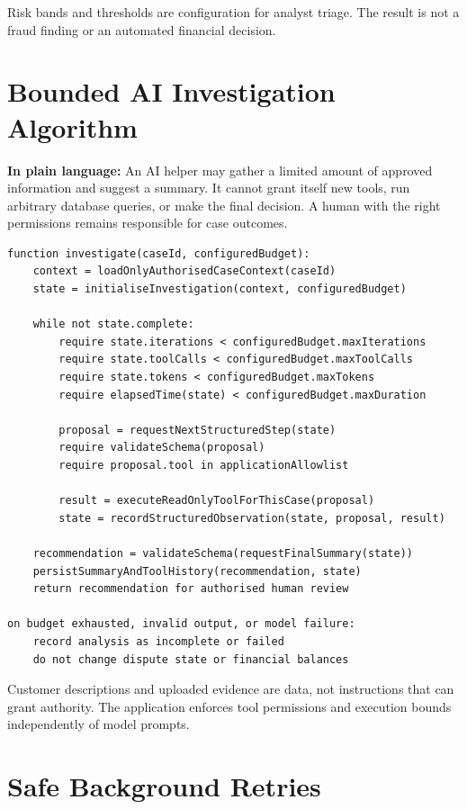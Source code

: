 \documentclass[11pt,a4paper]{article}
\begin{document}
Risk bands and thresholds are configuration for analyst triage. The
result is not a fraud finding or an automated financial decision.

\section{Bounded AI Investigation Algorithm}

\textbf{In plain language:} An AI helper may gather a limited amount of
approved information and suggest a summary. It cannot grant itself new
tools, run arbitrary database queries, or make the final decision. A
human with the right permissions remains responsible for case outcomes.

\begin{lstlisting}[style=pseudocode,caption={Running a bounded investigation}]
function investigate(caseId, configuredBudget):
    context = loadOnlyAuthorisedCaseContext(caseId)
    state = initialiseInvestigation(context, configuredBudget)

    while not state.complete:
        require state.iterations < configuredBudget.maxIterations
        require state.toolCalls < configuredBudget.maxToolCalls
        require state.tokens < configuredBudget.maxTokens
        require elapsedTime(state) < configuredBudget.maxDuration

        proposal = requestNextStructuredStep(state)
        require validateSchema(proposal)
        require proposal.tool in applicationAllowlist

        result = executeReadOnlyToolForThisCase(proposal)
        state = recordStructuredObservation(state, proposal, result)

    recommendation = validateSchema(requestFinalSummary(state))
    persistSummaryAndToolHistory(recommendation, state)
    return recommendation for authorised human review

on budget exhausted, invalid output, or model failure:
    record analysis as incomplete or failed
    do not change dispute state or financial balances
\end{lstlisting}

Customer descriptions and uploaded evidence are data, not instructions
that can grant authority. The application enforces tool permissions and
execution bounds independently of model prompts.

\section{Safe Background Retries}
\end{document}
